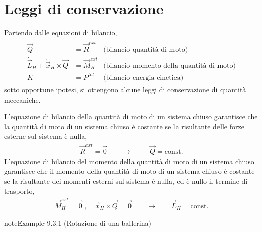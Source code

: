 \documentclass[letterpaper,10pt,italian]{jupyterBook}
\begin{document}
\section{Leggi di conservazione}
\label{\detokenize{ch/mechanics/dynamics-conservation:leggi-di-conservazione}}\label{\detokenize{ch/mechanics/dynamics-conservation:physics-hs-mechanics-dynamics-conservation}}\label{\detokenize{ch/mechanics/dynamics-conservation::doc}}
\sphinxAtStartPar
Partendo dalle equazioni di bilancio,
\begin{equation*}
\begin{split}\begin{aligned}
 \dot{\vec{Q}} & = \vec{R}^{ext} & \text{(bilancio quantità di moto)} \\
 \dot{\vec{L}}_H + \dot{\vec{x}}_H \times \vec{Q} & = \vec{M}_H^{ext} & \text{(bilancio momento della quantità di moto)} \\
 \dot{K} & = P^{tot} & \text{(bilancio energia cinetica)}
\end{aligned}\end{split}
\end{equation*}
\sphinxAtStartPar
sotto opportune ipotesi, si ottengono alcune leggi di conservazione di quantità meccaniche.

\sphinxAtStartPar
{}
L’equazione di bilancio della quantità di moto di un sistema chiuso garantisce che la quantità di moto di un sistema chiuso è costante se la risultante delle forze esterne sul sistema è nulla,
\begin{equation*}
\begin{split}
  \vec{R}^{ext} = \vec{0} \qquad  \rightarrow \qquad \ \ \vec{Q} = \text{const.} 
\end{split}
\end{equation*}
\sphinxAtStartPar
{}
L’equazione di bilancio del momento della quantità di moto di un sistema chiuso garantisce che il momento della quantità di moto di un sistema chiuso è costante se la risultante dei momenti esterni sul sistema è nulla, ed è nullo il termine di trasporto,
\begin{equation*}
\begin{split}
  \vec{M}_H^{ext} = \vec{0} \ , \quad \dot{\vec{x}}_H \times \vec{Q} = \vec{0} \qquad  \rightarrow \qquad \vec{L}_H = \text{const.}
\end{split}
\end{equation*}\label{ch/mechanics/dynamics-conservation:example-0}
\begin{sphinxadmonition}{note}{Example 9.3.1 (Rotazione di una ballerina)}


\end{sphinxadmonition}
\end{document}
